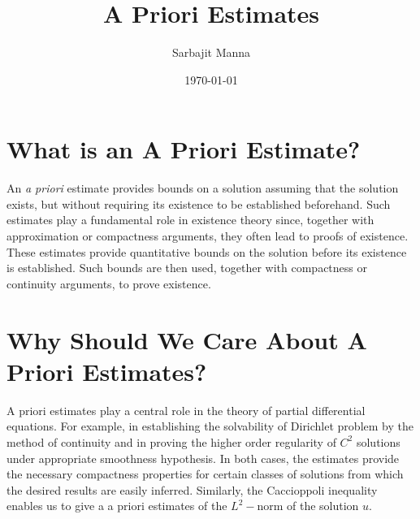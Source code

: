 \documentclass[11pt]{article}
\title{\textbf{A Priori Estimates}}
\author{Sarbajit Manna}
\date{\today}
\theoremstyle{definition}
\begin{document}
\maketitle


\vspace{1em}


\section{What is an A Priori Estimate?}

An \emph{a priori} estimate provides bounds on a solution assuming that the solution exists, but without requiring its existence to be established beforehand. Such estimates play a fundamental role in existence theory since, together with approximation or compactness arguments, they often lead to proofs of existence. These estimates provide quantitative bounds on the solution before its existence is established. Such bounds are then used, together with compactness or continuity arguments, to prove existence.

\section{Why Should We Care About A Priori Estimates?}
A priori estimates play a central role in the theory of partial differential equations.  For example, in establishing the solvability of Dirichlet problem by the method of continuity and in proving the higher order regularity of $C^2$ solutions under appropriate smoothness hypothesis. In both cases, the estimates provide the necessary compactness properties for certain classes of solutions from which the desired results are easily inferred. Similarly, the Caccioppoli inequality enables us to give a a priori estimates of the $L^2-$norm of the solution $u$.   
\end{document}
